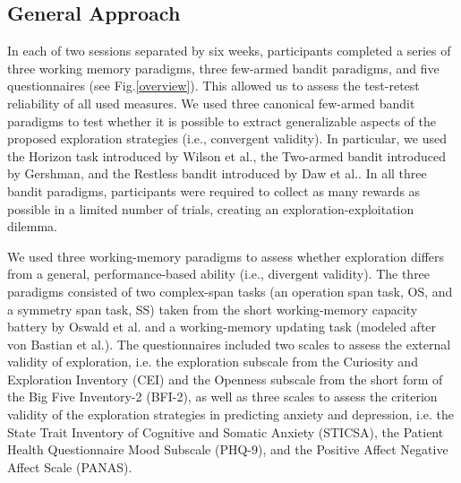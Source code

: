 \documentclass[fleqn,10pt]{wlscirep}
\begin{document}
\subsection*{General Approach}
In each of two sessions separated by six weeks, participants completed a series of three working memory paradigms, three few-armed bandit paradigms, and five questionnaires (see Fig.\ref{overview}). This allowed us to assess the test-retest reliability of all used measures. We used three canonical few-armed bandit paradigms to test whether it is possible to extract generalizable aspects of the proposed exploration strategies (i.e., convergent validity). In particular, we used the Horizon task introduced by Wilson et al.\cite{wilson_humans_2014}, the Two-armed bandit introduced by Gershman\cite{gershman_deconstructing_2018}, and the Restless bandit introduced by Daw et al.\cite{daw_cortical_2006}. In all three bandit paradigms, participants were required to collect as many rewards as possible in a limited number of trials, creating an exploration-exploitation dilemma.

We used three working-memory paradigms to assess whether exploration differs from a general, performance-based ability (i.e., divergent validity). The three paradigms consisted of two complex-span tasks (an operation span task, OS, and a symmetry span task, SS) \cite{turner_is_1989} taken from the short working-memory capacity battery by Oswald et al.\cite{oswald_development_2015} and a working-memory updating task (modeled after von Bastian et al.\cite{von_bastian_no_2016}). The questionnaires included two scales to assess the external validity of exploration, i.e. the exploration subscale from the Curiosity and Exploration Inventory (CEI)\cite{kashdan2004curiosity} and the Openness subscale from the short form of the Big Five Inventory-2 (BFI-2)\cite{soto2017short}, as well as three scales to assess the criterion validity of the exploration strategies in predicting anxiety and depression, i.e. the State Trait Inventory of Cognitive and Somatic Anxiety (STICSA)\cite{ree2008distinguishing}, the Patient Health Questionnaire Mood Subscale (PHQ-9)\cite{kroenke2001phq}, and the Positive Affect Negative Affect Scale (PANAS)\cite{watson1988development}.

\end{document}
